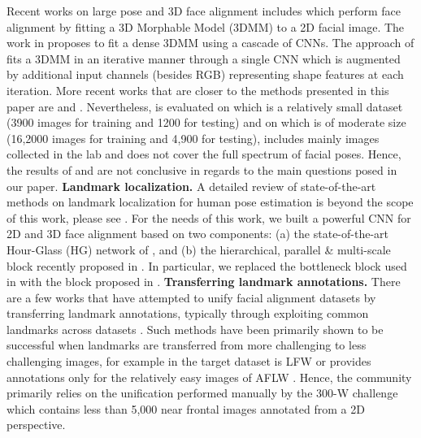 	Recent works on large pose and 3D face alignment includes  \cite{jourabloo2016large, zhu2016face} which perform face alignment by fitting a 3D Morphable Model (3DMM) to a 2D facial image. The work in \cite{jourabloo2016large} proposes to fit a dense 3DMM using a cascade of CNNs. The approach of \cite{zhu2016face} fits a 3DMM in an iterative manner through a single CNN which is augmented by additional input channels (besides RGB) representing shape features at each iteration. More recent works that are closer to the methods presented in this paper are \cite{bulat2016convolutional} and \cite{bulat2016two}. Nevertheless, \cite{bulat2016convolutional} is evaluated on \cite{jourabloo2016large} which is a relatively small dataset (3900 images for training and 1200 for testing) and \cite{bulat2016two} on \cite{jeni2016first} which is of moderate size (16,2000 images for training and 4,900 for testing), includes mainly images collected in the lab and does not cover the full spectrum of facial poses. Hence, the results of \cite{bulat2016convolutional} and \cite{bulat2016two} are not conclusive in regards to the main questions posed in our paper.  
	\textbf{Landmark localization.} A detailed review of state-of-the-art methods on landmark localization for human pose estimation is beyond the scope of this work, please see \cite{toshev2014deeppose, tompson2014joint, pfister2015flowing, insafutdinov2016deepercut, pishchulin2016deepcut, wei2016convolutional, newell2016stacked, bulat2016human}. For the needs of this work, we built a powerful CNN for 2D and 3D face alignment based on two components: (a) the state-of-the-art Hour-Glass (HG) network of \cite{newell2016stacked}, and (b) the hierarchical, parallel \& multi-scale block recently proposed in \cite{bulat2017binarized}. In particular, we replaced the bottleneck block \cite{he2016identity} used in \cite{newell2016stacked} with the block proposed in \cite{bulat2017binarized}.  
	\textbf{Transferring landmark annotations.} There are a few works that have attempted to unify facial alignment datasets by transferring landmark annotations, typically through exploiting common landmarks across datasets \cite{zhu2014transferring, smith2014collaborative, zhang2015leveraging}. Such methods have been primarily shown to be successful when landmarks are transferred from more challenging to less challenging images, for example in \cite{zhu2014transferring} the target dataset is LFW \cite{huang2007labeled} or \cite{smith2014collaborative} provides annotations only for the relatively easy images of AFLW \cite{kostinger2011annotated}. Hence, the community primarily relies on the unification performed manually by the 300-W challenge \cite{sagonas2013300} which contains less than 5,000 near frontal images annotated from a 2D perspective. 

